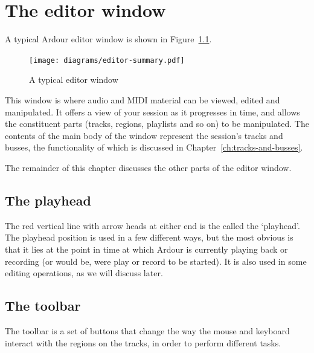 \documentclass[10pt,a4paper]{book}
\begin{document}

\chapter{The editor window}
\label{ch:editor-window}

A typical Ardour editor window is shown in Figure~\ref{fig:typical-editor2}.

\begin{figure}[ht]
\begin{center}
\texttt{[image: diagrams/editor-summary.pdf]}
\end{center}
\caption{A typical editor window}
\label{fig:typical-editor2}
\end{figure}

This window is where audio and MIDI material can be viewed, edited and
manipulated.  It offers a view of your session as it progresses in
time, and allows the constituent parts (tracks, regions, playlists and
so on) to be manipulated.  The contents of the main body of the window
represent the session's tracks and busses, the functionality of which
is discussed in Chapter~\ref{ch:tracks-and-busses}.

The remainder of this chapter discusses the other parts of the editor window.


\section{The playhead}

The red vertical line with arrow heads at either end is the called the
`playhead'.  The playhead position is used in a few different ways,
but the most obvious is that it lies at the point in time at which
Ardour is currently playing back or recording (or would be, were play
or record to be started).  It is also used in some editing operations,
as we will discuss later.


\section{The toolbar}

The toolbar is a set of buttons that change the way the mouse and
keyboard interact with the regions on the tracks, in order to perform
different tasks.
\end{document}

